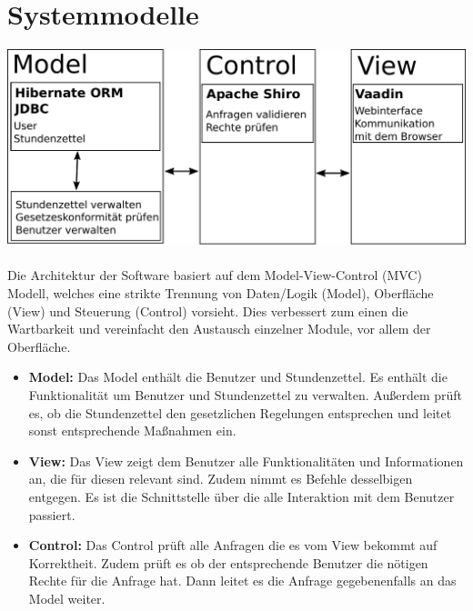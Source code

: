 \section{Systemmodelle}

\includegraphics[width=\linewidth]{mvc.pdf}\\
\\
Die Architektur der Software basiert auf dem Model-View-Control (MVC) Modell, welches eine strikte Trennung von Daten/Logik (Model), Oberfläche (View) und Steuerung (Control) vorsieht.
Dies verbessert zum einen die Wartbarkeit und vereinfacht den Austausch einzelner Module, vor allem der Oberfläche.
\begin{itemize}
	\item \textbf{Model:}
		Das Model enthält die Benutzer und Stundenzettel.
		Es enthält die Funktionalität um Benutzer und Stundenzettel zu verwalten.
		Außerdem prüft es, ob die Stundenzettel den gesetzlichen Regelungen entsprechen und leitet sonst entsprechende Maßnahmen ein.
	\item \textbf{View:}
		Das View zeigt dem Benutzer alle Funktionalitäten und Informationen an, die für diesen relevant sind.
		Zudem nimmt es Befehle desselbigen entgegen.
		Es ist die Schnittstelle über die alle Interaktion mit dem Benutzer passiert.
	\item \textbf{Control:}
		Das Control prüft alle Anfragen die es vom View bekommt auf Korrektheit.
		Zudem prüft es ob der entsprechende Benutzer die nötigen Rechte für die Anfrage hat.
		Dann leitet es die Anfrage gegebenenfalls an das Model weiter.
\end{itemize}

